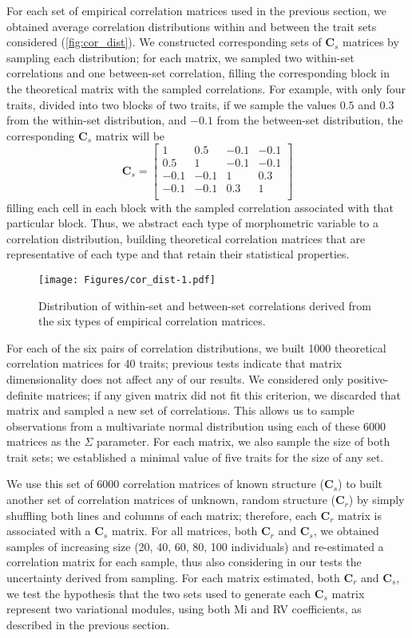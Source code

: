\documentclass[12pt,]{article}
\begin{document}
For each set of empirical correlation matrices used in the previous
section, we obtained average correlation distributions within and
between the trait sets considered (\autoref{fig:cor_dist}). We
constructed corresponding sets of $\mathbf{C}_{s}$ matrices by sampling
each distribution; for each matrix, we sampled two within-set
correlations and one between-set correlation, filling the corresponding
block in the theoretical matrix with the sampled correlations. For
example, with only four traits, divided into two blocks of two traits,
if we sample the values $0.5$ and $0.3$ from the within-set
distribution, and $-0.1$ from the between-set distribution, the
corresponding $\mathbf{C}_{s}$ matrix will be \[
\mathbf{C}_s =
\begin{bmatrix}
1 & 0.5 & -0.1 & -0.1 \\
0.5 & 1 & -0.1 & -0.1 \\
-0.1 & -0.1 & 1 & 0.3 \\
-0.1 & -0.1 & 0.3 & 1 \\
\end{bmatrix}
\] filling each cell in each block with the sampled correlation
associated with that particular block. Thus, we abstract each type of
morphometric variable to a correlation distribution, building
theoretical correlation matrices that are representative of each type
and that retain their statistical properties.

\begin{figure}[htbp]
\centering
\texttt{[image: Figures/cor\_dist-1.pdf]}
\caption{Distribution of within-set and between-set correlations derived
from the six types of empirical correlation matrices.
\label{fig:cor_dist}}
\end{figure}

For each of the six pairs of correlation distributions, we built 1000
theoretical correlation matrices for 40 traits; previous tests indicate
that matrix dimensionality does not affect any of our results. We
considered only positive-definite matrices; if any given matrix did not
fit this criterion, we discarded that matrix and sampled a new set of
correlations. This allows us to sample observations from a multivariate
normal distribution using each of these 6000 matrices as the $\Sigma$
parameter. For each matrix, we also sample the size of both trait sets;
we established a minimal value of five traits for the size of any set.

We use this set of 6000 correlation matrices of known structure
($\mathbf{C}_s$) to built another set of correlation matrices of
unknown, random structure ($\mathbf{C}_r$) by simply shuffling both
lines and columns of each matrix; therefore, each $\mathbf{C}_r$ matrix
is associated with a $\mathbf{C}_s$ matrix. For all matrices, both
$\mathbf{C}_r$ and $\mathbf{C}_s$, we obtained samples of increasing
size (20, 40, 60, 80, 100 individuals) and re-estimated a correlation
matrix for each sample, thus also considering in our tests the
uncertainty derived from sampling. For each matrix estimated, both
$\mathbf{C}_r$ and $\mathbf{C}_s$, we test the hypothesis that the two
sets used to generate each $\mathbf{C}_s$ matrix represent two
variational modules, using both Mi and RV coefficients, as described in
the previous section.
\end{document}

